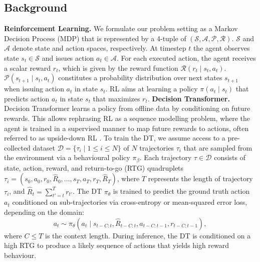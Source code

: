 \documentclass{article}
\begin{document}
\subsection{Background}
\textbf{Reinforcement Learning.}
We formulate our problem setting as a Markov Decision Process (MDP) that is represented by a 4-tuple of $(\mathcal{S},\mathcal{A},\mathcal{P},\mathcal{R})$.
$\mathcal{S}$ and $\mathcal{A}$ denote state and action spaces, respectively.
At timestep $t$ the agent observes state $s_t \in \mathcal{S}$ and issues action $a_t \in \mathcal{A}$.
For each executed action, the agent receives a scalar reward $r_t$, which is given by the reward function $\mathcal{R}(r_t \mid s_t, a_t)$.
$\mathcal{P}(s_{t+1}\mid s_t, a_t)$ constitutes a probability distribution over next states $s_{t+1}$ when issuing action $a_t$ in state $s_t$.
RL aims at learning a policy $\pi(a_t\mid s_t)$ that predicts action $a_t$ in state $s_t$ that maximizes $r_t$.
\textbf{Decision Transformer.}
Decision Transformer \citep[DT]{Chen:21} learns a policy from offline data by conditioning on future rewards.
This allows rephrasing RL as a sequence modelling problem, where the agent is trained in a supervised manner to map future rewards to actions, often referred to as upside-down RL \citep{Schmidhuber:19}.
To train the DT, we assume access to a pre-collected dataset $\mathcal{D}=\{\tau_i \mid 1 \leq i \leq N \}$ of $N$ trajectories $\tau_i$ that are sampled from the environment via a behavioural policy $\pi_\beta$.
Each trajectory $\tau \in \mathcal{D}$ consists of state, action, reward, and return-to-go (RTG) quadruplets $\tau_i=(s_0, a_0, r_0, \hat{R}_0, \ldots, s_T, a_T, r_T, \hat{R}_T)$, where $T$ represents the length of trajectory $\tau_i$, and $\hat{R}_t = \sum_{t'=t}^T r_{t'}$.
The DT $\pi_\theta$ is trained to predict the ground truth action $a_t$ conditioned on sub-trajectories via cross-entropy or mean-squared error loss, depending on the domain:
\begin{equation}
  a_t \sim \pi_{\theta} (a_t \mid s_{t-C: t}, \hat R_{t-C:t}, a_{t-C:t-1}, r_{t-C:t-1}),
\end{equation}
where $C \leq T$ is the context length.
During inference, the DT is conditioned on a high RTG to produce a likely sequence of actions that yields high reward behaviour.
\end{document}
